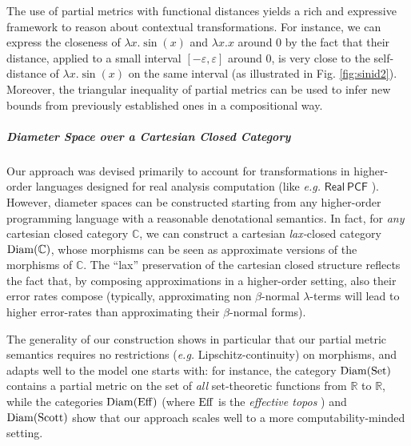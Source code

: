 The use of partial metrics with functional distances yields a rich and expressive framework to reason about  
contextual transformations. For instance, we can express the closeness of $\lambda x.\sin(x)$ and $\lambda x.x$ around 0 by the fact that their distance, applied to a small interval $[-\varepsilon,\varepsilon]$ around 0, is very close to the {self-distance} of
$\lambda x.\sin(x)$ on the same interval (as illustrated in Fig. \ref{fig:sinid2}). Moreover, the {triangular inequality} of partial metrics  can be used to infer new bounds from previously established ones in a compositional way.
\subparagraph*{Diameter Space over a Cartesian Closed Category}

Our approach was devised primarily to account for transformations in higher-order languages designed for real analysis computation (like \emph{e.g.} $\mathsf{Real\ PCF}$ \cite{Edalat:2000aa}). However, diameter spaces can be constructed starting from any higher-order programming language with a reasonable denotational semantics. In fact, for \emph{any} cartesian closed category $\mathbb C$, we can construct a cartesian \emph{lax-}closed category $\operatorname{Diam}(\mathbb C)$, whose morphisms can be seen as approximate versions  of the morphisms of $\mathbb C$. The ``lax'' preservation of the cartesian closed structure reflects the fact that, by composing approximations in a higher-order setting, also their error rates compose (typically, approximating non $\beta$-normal $\lambda$-terms will lead to higher error-rates than approximating their $\beta$-normal forms). 



The generality of our construction shows in particular that our partial metric semantics requires no restrictions (\textit{e.g.} Lipschitz-continuity) on morphisms, and adapts well to the model one starts with: for instance, the category $\operatorname{Diam}(\operatorname{Set})$ contains a partial metric on the set of \emph{all}  set-theoretic functions from $\mathbb R$ to $\mathbb R$, while the categories $\operatorname{Diam}(\operatorname{Eff})$ (where $\operatorname{Eff}$ is the \emph{effective topos} \cite{hyland:effective-topos}) and $\operatorname{Diam}(\operatorname{Scott})$ show that our approach scales well to a more computability-minded setting.

